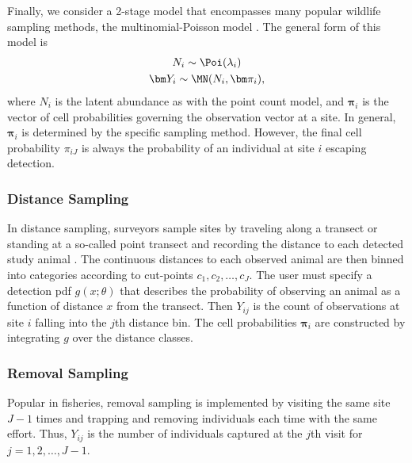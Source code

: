 Finally, we consider a 2-stage model that encompasses many popular wildlife sampling methods,
the multinomial-Poisson model \citep{royle_generalized_2004}.  The general form of this model is
\begin{gather}
  N_i \sim \Poi(\lambda_i) \label{eq:mp2} \\
  \bm Y_i \sim \MN(N_i, \bm \pi_i),
\end{gather}
where $N_i$ is the latent abundance as with the point count model, and
$\bm \pi_i$ is the vector of cell probabilities governing the
observation vector at a site.  In general, $\bm \pi_i$ is determined by the
specific sampling method.  However, the final cell probability $\pi_{iJ}$ is
always the probability of an individual at site $i$ escaping detection.

\subsubsection{Distance Sampling}

In distance sampling, surveyors sample sites by traveling along a
transect or standing at a so-called point transect and recording the
distance to each detected study animal
\citep{buckland_introduction_2001}.  The continuous distances to each
observed animal are then binned into categories according to
cut-points $c_1, c_2,\dots,c_{J}$.  The user must specify a
detection pdf $g(x;\theta)$ that describes the probability of
observing an animal as a function of distance $x$ from the transect.
Then  $Y_{ij}$ is the count of observations at site $i$ falling into
the $j$th distance bin.   The cell probabilities $\bm \pi_i$ are
constructed by integrating $g$ over the distance classes.


\subsubsection{Removal Sampling}

Popular in fisheries, removal sampling is implemented by
visiting the same site $J-1$ times and trapping and removing individuals each time
with the same effort.  Thus, $Y_{ij}$ is the number
of individuals captured at the $j$th visit for $j=1,2,\dots,J-1$.

